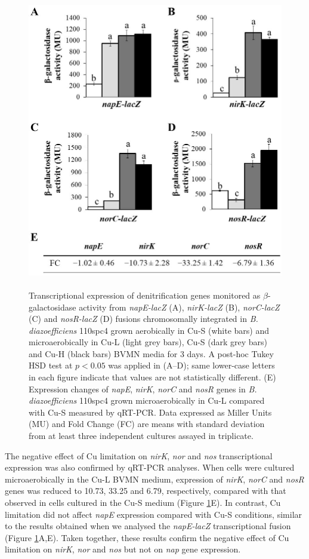 \documentclass[a4paper,11pt]{article}
\begin{document}
\begin{figure}[h!]
\centering
\includegraphics[height=13cm]{Images/Figure2 (2).jpg}
\caption{Transcriptional expression of denitrification genes monitored as $\beta$-galactosidase activity
from {\em napE-lacZ} (A), {\em nirK-lacZ} (B), {\em norC-lacZ} (C) and {\em nosR-lacZ} (D) fusions chromosomally integrated
in {\em B. diazoefficiens} 110spc4 grown aerobically in Cu-S (white bars) and microaerobically in Cu-L (light
grey bars), Cu-S (dark grey bars) and Cu-H (black bars) BVMN media for 3 days. A post-hoc Tukey
HSD test at $p<0.05$ was applied in (A–D); same lower-case letters in each figure indicate that
values are not statistically different. (E) Expression changes of {\em napE}, {\em nirK}, {\em norC} and {\em nosR} genes in
{\em B. diazoefficiens} 110spc4 grown microaerobically in Cu-L compared with Cu-S measured by qRT-PCR.
Data expressed as Miller Units (MU) and Fold Change (FC) are means with standard deviation from
at least three independent cultures assayed in triplicate.}
\label{fig:figure2}
\end{figure}

The negative effect of Cu limitation on {\em nirK}, {\em nor} and {\em nos} transcriptional expression was also confirmed by qRT-PCR analyses. When cells were cultured microaerobically in
the Cu-L BVMN medium, expression of {\em nirK}, {\em norC} and {\em nosR} genes was reduced to 10.73,
33.25 and 6.79, respectively, compared with that observed in cells cultured in the Cu-S
medium (Figure \ref{fig:figure2}E). In contrast, Cu limitation did not affect {\em napE} expression compared
with Cu-S conditions, similar to the results obtained when we analysed the {\em napE-lacZ}
transcriptional fusion (Figure \ref{fig:figure2}A,E). Taken together, these results confirm the negative
effect of Cu limitation on {\em nirK}, {\em nor} and {\em nos} but not on {\em nap} gene expression.
\end{document}
